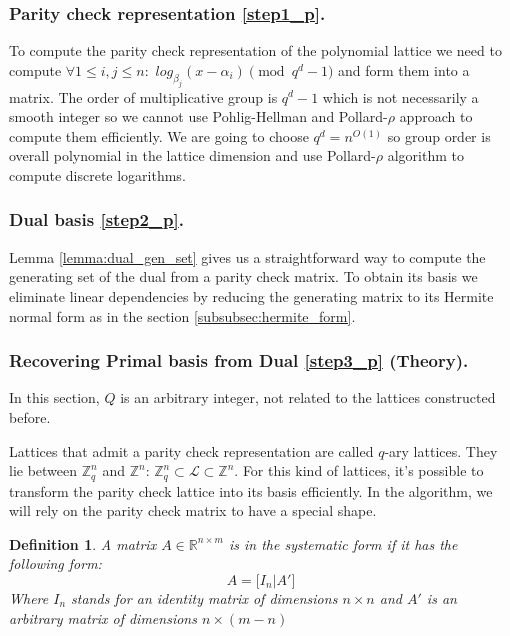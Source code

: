\documentclass[12pt]{article}
\newcommand{\ZZ}{\mathbb{Z}}
\newcommand{\LL}{\mathcal{L}}
\newtheorem{definition}{Definition}
\begin{document}
\subsubsection{Parity check representation \ref{step1_p}.}
\label{subsubsec:parity_check_polynomials}
To compute the parity check representation of the polynomial lattice we need to compute
$\forall 1 \leq i,j \leq n :$ $log_{\beta_j}(x - \alpha_i) \pmod{q^{d} -1}$ and form them into a matrix. The order of multiplicative group is $q^{d} - 1$ which is not necessarily a smooth integer so we cannot use Pohlig-Hellman \cite{[PH78]} and Pollard-$\rho$ \cite{[Pol78]} approach to compute them efficiently. We are going to choose $q^{d} = n^{O(1)}$ so group order is overall polynomial in the lattice dimension and use Pollard-$\rho$ \cite{[Pol78]} algorithm to compute discrete logarithms.

\subsubsection{Dual basis \ref{step2_p}.}
\label{subsubsec:dual_gen_set_polynomials}

Lemma \ref{lemma:dual_gen_set} gives us a straightforward way to compute the generating set of the dual from a parity check matrix. To obtain its basis we eliminate linear dependencies by reducing the generating matrix to its Hermite normal form as in the section \ref{subsubsec:hermite_form}.

\subsubsection{Recovering Primal basis from Dual \ref{step3_p} (Theory).}
\label{subsubsec:primal_from_dual_t_polynomials}

In this section, $Q$ is an arbitrary integer, not related to the lattices constructed before.

Lattices that admit a parity check representation are called $q$-ary lattices. They lie between $\ZZ^{n}_{q}$ and $\ZZ^{n}$: $\ZZ^{n}_{q}  \subset \LL \subset \ZZ^{n}$. For this kind of lattices, it's possible to transform the parity check lattice into its basis efficiently. In the algorithm, we will rely on the parity check matrix to have a special shape.
\begin{definition}
A matrix $A \in \mathbb{R}^{n \times m}$ is in the systematic form if it has the following form:
\[
A = \big[ I_{n} | A' \big]
\]
Where $I_{n}$ stands for an identity matrix of dimensions $n \times n$ and $A'$ is an arbitrary matrix of dimensions $n \times (m-n)$
\end{definition}
\end{document}
